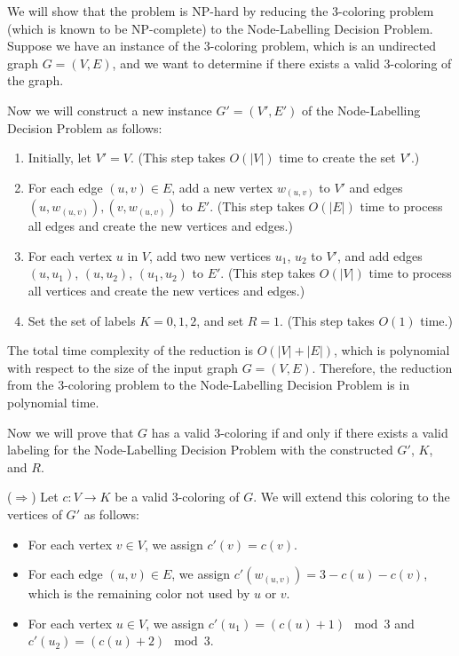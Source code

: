 \documentclass{article}
\begin{document}
\begin{enumerate}
    We will show that the problem is NP-hard by reducing the 3-coloring problem (which is known to be NP-complete) to the Node-Labelling Decision Problem. Suppose we have an instance of the 3-coloring problem, which is an undirected graph $G=(V, E)$, and we want to determine if there exists a valid 3-coloring of the graph.

    Now we will construct a new instance $G'=(V',E')$ of the Node-Labelling Decision Problem as follows:
    \begin{enumerate}
        \item Initially, let $V'=V$. (This step takes $O(|V|)$ time to create the set $V'$.)
        \item For each edge $(u, v) \in E$, add a new vertex $w_{(u, v)}$ to $V'$ and edges $(u, w_{(u, v)}), (v, w_{(u, v)})$ to $E'$. (This step takes $O(|E|)$ time to process all edges and create the new vertices and edges.)
        \item For each vertex $u$ in $V$, add two new vertices $u_1$, $u_2$ to $V'$, and add edges $(u, u_1)$, $(u, u_2)$, $(u_1, u_2)$ to $E'$. (This step takes $O(|V|)$ time to process all vertices and create the new vertices and edges.)
        \item Set the set of labels $K = {0, 1, 2}$, and set $R = 1$. (This step takes $O(1)$ time.)
    \end{enumerate}

    The total time complexity of the reduction is $O(|V| + |E|)$, which is polynomial with respect to the size of the input graph $G=(V, E)$. Therefore, the reduction from the 3-coloring problem to the Node-Labelling Decision Problem is in polynomial time.

    Now we will prove that $G$ has a valid 3-coloring if and only if there exists a valid labeling for the Node-Labelling Decision Problem with the constructed $G'$, $K$, and $R$.

    ($\Rightarrow$) Let $c: V \rightarrow K$ be a valid 3-coloring of $G$. We will extend this coloring to the vertices of $G'$ as follows:
    \begin{itemize}
        \item For each vertex $v \in V$, we assign $c'(v) = c(v)$.
        \item For each edge $(u, v) \in E$, we assign $c'(w_{(u, v)}) = 3 - c(u) - c(v)$, which is the remaining color not used by $u$ or $v$.
        \item For each vertex $u \in V$, we assign $c'(u_1) = (c(u) + 1) \mod 3$ and $c'(u_2) = (c(u) + 2) \mod 3$.
    \end{itemize}


\end{enumerate}
\end{document}
